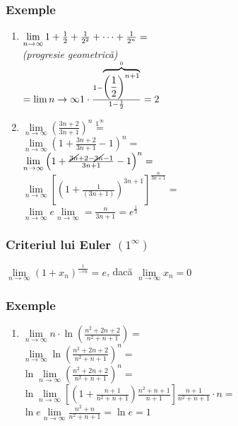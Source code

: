 \documentclass[a4paper, 12pt, notitlepage]{book}
\begin{document}
    \subsubsection{Exemple}
    \begin{enumerate}
      \item $\lim\limits_{n\to\infty} 1+ {1 \over 2} + {1 \over 2^{2}} + \cdots + {1 \over 2^{n}}=$\\[5pt]
            \textit{(progresie geometric\u{a})}\\[5pt]
            $= \lim\limits{n\to\infty} 1 \cdot \frac{1 - \overbrace{ { \left(1 \over 2 \right) }^{n+1} }^{0} }{1- {1 \over 2}} = 2$\\[5pt]
      \item $\lim\limits_{n\to\infty} {\left( \frac{3n+2}{3n+1} \right)}^{n} \stackrel{1^{\infty}}{=}$\\[5pt]
            $\lim\limits_{n\to\infty} {\left( 1 + \frac{3n+2}{3n+1} - 1 \right)}^{n} =$\\[5pt]
            $\lim\limits_{n\to\infty} {\left( 1 + \frac{\cancel{3n} + 2 - \cancel{3n} - 1}{3n+1} - 1 \right)}^{n} =$\\[5pt]
            $\lim\limits_{n\to\infty} {\left[ {\left( 1 + \frac{1}{(3n+1)} \right)}^{3n+1} \right]}^{\frac{n}{3n+1}} =$\\[5pt]
            $\lim\limits_{n\to\infty} e \lim\limits_{n\to\infty} = \frac{n}{3n+1} = e^{\frac{1}{3}}$\\[5pt]
    \end{enumerate}

    \subsubsection{Criteriul lui Euler $(1^{\infty})$}
    $\lim\limits_{n\to\infty} {(1+x_{n})}^{\frac{1}{-e n}} = e$, dac\u{a} $\lim\limits_{n\to\infty} x_{n}=0$

    \subsubsection{Exemple}
    \begin{enumerate}
      \item $\lim\limits_{n\to\infty} n \cdot \ln \left( \frac{n^{2} + 2n + 2}{n^{2} + n + 1} \right) = $\\[5pt]
            $\lim\limits_{n\to\infty} \ln {\left( \frac{n^{2} + 2n + 2}{n^{2} + n + 1} \right)}^{n} = $\\[5pt]
            $\ln \lim\limits_{n\to\infty} {\left( \frac{n^{2} + 2n + 2}{n^{2} + n + 1} \right)}^{n} = $\\[5pt]
            $\ln \lim\limits_{n\to\infty} \left[ \left( 1 + \frac{n+1}{n^{2} + n + 1} \right) \frac{n^{2} + n + 1}{n+1} \right] \frac{n+1}{n^{2} + n + 1} \cdot n =$\\[5pt]
            $\ln e \lim\limits_{n\to\infty} \frac{n^{2} + n}{n^{2} + n + 1} = \ln e = 1$\\[5pt]
    \end{enumerate}
\end{document}
